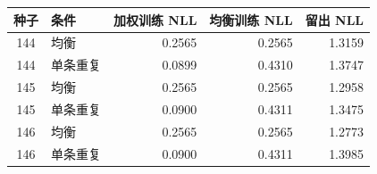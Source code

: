 \begin{center}\begin{tabular}{clrrr}\toprule
种子 & 条件 & 加权训练 NLL & 均衡训练 NLL & 留出 NLL \\ \midrule
144 & 均衡 & 0.2565 & 0.2565 & 1.3159 \\
144 & 单条重复 & 0.0899 & 0.4310 & 1.3747 \\
145 & 均衡 & 0.2565 & 0.2565 & 1.2958 \\
145 & 单条重复 & 0.0900 & 0.4311 & 1.3475 \\
146 & 均衡 & 0.2565 & 0.2565 & 1.2773 \\
146 & 单条重复 & 0.0900 & 0.4311 & 1.3985 \\
\bottomrule\end{tabular}\end{center}
